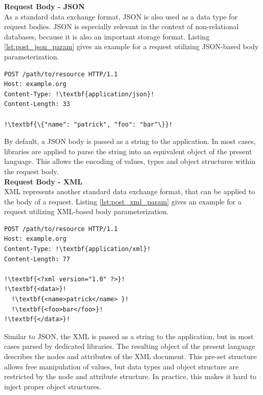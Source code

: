 \textbf{Request Body - JSON}\\
As a standard data exchange format, JSON is also used as a data type for request bodies. JSON is especially relevant in the context of non-relational databases, because it is also an important storage format. Listing \ref{lst:post_json_param} gives an example for a request utilizing JSON-based body parameterization. \\ 

\begin{lstlisting}[escapechar=!, caption={Example for POST request with JSON-based body parameterization}, label={lst:post_json_param}]
POST /path/to/resource HTTP/1.1
Host: example.org
Content-Type: !\textbf{application/json}!
Content-Length: 33

!\textbf{\{"name": "patrick", "foo": "bar"\}}!
\end{lstlisting}

By default, a JSON body is passed as a string to the application. In most cases, libraries are applied to parse the string into an equivalent object of the present language. This allows the encoding of values, types and object structures within the request body. \\

\textbf{Request Body - XML}\\
XML represents another standard data exchange format, that can be applied to the body of a request. Listing \ref{lst:post_xml_param} gives an example for a request utilizing XML-based body parameterization. \\ 

\begin{lstlisting}[escapechar=!, caption={Example for POST request with XML-based body parameterization}, label={lst:post_xml_param}]
POST /path/to/resource HTTP/1.1
Host: example.org
Content-Type: !\textbf{application/xml}!
Content-Length: 77

!\textbf{<?xml version="1.0" ?>}!
!\textbf{<data>}!
  !\textbf{<name>patrick</name> }!
  !\textbf{<foo>bar</foo>}!
!\textbf{</data>}!
\end{lstlisting}

Similar to JSON, the XML is passed as a string to the application, but in most cases parsed by dedicated libraries. The resulting object of the present language describes the nodes and attributes of the XML document. This pre-set structure allows free manipulation of values, but data types and object structure are restricted by the node and attribute structure. In practice, this makes it hard to inject proper object structures. \\

